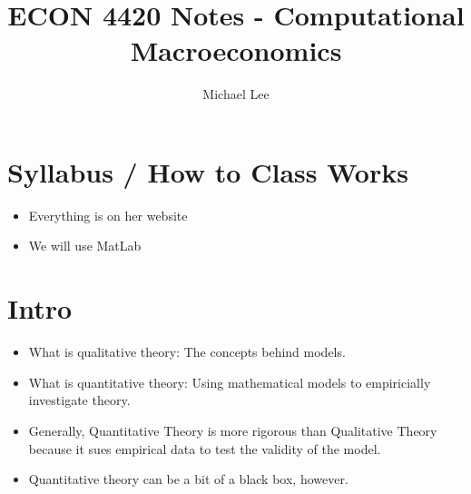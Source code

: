 \documentclass[11pt]{article}
\title{ECON 4420 Notes - Computational Macroeconomics}
\author{Michael Lee}
\begin{document}
\maketitle

\tableofcontents
\newpage

\section{Syllabus / How to Class Works}
\begin{itemize}
    \item Everything is on her website
    \item We will use MatLab
\end{itemize}

\section{Intro}
\begin{itemize}
    \item What is qualitative theory: The concepts behind models.
    \item What is quantitative theory: Using mathematical models to empiricially investigate theory.
    \item Generally, Quantitative Theory is more rigorous than Qualitative Theory because it sues empirical data to test the validity of the model.
    \item Quantitative theory can be a bit of a black box, however.
\end{itemize}
\end{document}
